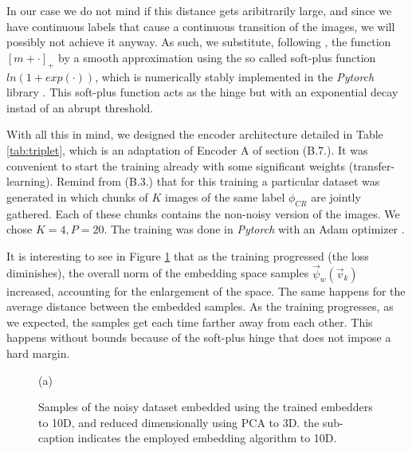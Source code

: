 \documentclass[11pt, a4paper, twoside]{article} %
\begin{document}
In our case we do not mind if this distance gets aribitrarily large, and since we have continuous labels that cause a continuous transition of the images, we will possibly not achieve it anyway. As such, we substitute, following \cite{triplet}, the function $[m+\cdot]_+$ by a smooth approximation using the so called soft-plus function $ln(1+exp(\cdot))$, which is numerically stably implemented in the {\em Pytorch} library \cite{pytorch}. This soft-plus function acts as the hinge but with an exponential decay instad of an abrupt threshold.

With all this in mind, we designed the encoder architecture detailed in Table \ref{tab:triplet}, which is an adaptation of Encoder A of section (B.7.). It was convenient to start the training already with some significant weights (transfer-learning). Remind from (B.3.) that for this training a particular dataset was generated in which chunks of $K$ images of the same label $\phi_{CR}$ are jointly gathered. Each of these chunks contains the non-noisy version of the images. We chose $K=4,P=20$. The training was done in {\em Pytorch} with an Adam optimizer \cite{adam}.

It is interesting to see in Figure \ref{fig:triplet} that as the training progressed (the loss diminishes), the overall norm of the embedding space samples $\vec{\psi}_w(\vec{v}_k)$ increased, accounting for the enlargement of the space. The same happens for the average distance between the embedded samples. As the training progresses, as we expected, the samples get each time farther away from each other. This happens without bounds because of the soft-plus hinge that does not impose a hard margin.

\begin{figure}[h!] 
     \centering 
    \caption{ (a) }
    \label{fig:triplet}
\end{figure}

\begin{figure}[h!] 
     \centering 
    \caption{ Samples of the noisy dataset embedded using the trained embedders to 10D, and reduced dimensionally using PCA to 3D. the sub-caption indicates the employed embedding algorithm to 10D.  }
    \label{fig:embeddings1}
\end{figure}
\end{document}
